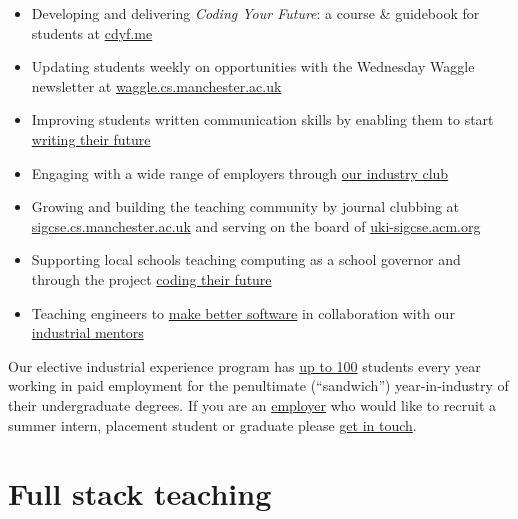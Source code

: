 \documentclass[
  12pt,
]{book}
\providecommand{\tightlist}{%
  \setlength{\itemsep}{0pt}\setlength{\parskip}{0pt}}
\begin{document}
\begin{itemize}
\tightlist
\item
  Developing and delivering \emph{Coding Your Future}: a course \& guidebook for students at \href{https://www.cdyf.me}{cdyf.me}
\item
  Updating students weekly on opportunities with the Wednesday Waggle newsletter at \href{https://waggle.cs.manchester.ac.uk/waggle/about}{waggle.cs.manchester.ac.uk} 🐝
\item
  Improving students written communication skills by enabling them to start \href{https://www.cdyf.me/writing}{writing their future}
\item
  Engaging with a wide range of employers through \href{https://www.cs.manchester.ac.uk/connect/business-engagement/}{our industry club}
\item
  Growing and building the teaching community by journal clubbing at \href{https://sigcse.cs.manchester.ac.uk/}{sigcse.cs.manchester.ac.uk} and serving on the board of \href{https://uki-sigcse.acm.org/}{uki-sigcse.acm.org}
\item
  Supporting local schools teaching computing as a school governor and through the project \href{https://personalpages.manchester.ac.uk/staff/duncan.hull/coding-their-future.html}{coding their future}
\item
  Teaching engineers to \href{https://software-eng.netlify.app/}{make better software} in collaboration with our \href{https://www.cs.manchester.ac.uk/connect/business-engagement/industrial-mentoring/}{industrial mentors}
\end{itemize}

Our elective industrial experience program has \protect\hyperlink{employability}{up to 100} students every year working in paid employment for the penultimate (``sandwich'') year-in-industry of their undergraduate degrees. If you are an \href{https://personalpages.manchester.ac.uk/staff/duncan.hull/employers.html}{employer} who would like to recruit a summer intern, placement student or graduate please \href{https://personalpages.manchester.ac.uk/staff/duncan.hull/contact.html}{get in touch}.

\hypertarget{full-stack-teaching}{%
\section*{Full stack teaching}\label{full-stack-teaching}}
\end{document}

